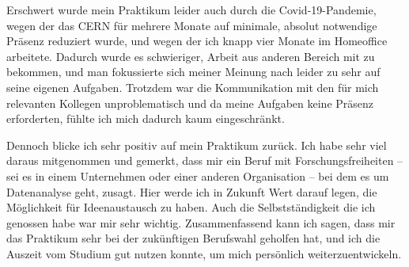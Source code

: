 \documentclass[11pt, a4paper, titlepage, headings=standardclasses]{scrartcl}
\begin{document}
Erschwert wurde mein Praktikum leider auch durch die Covid-19-Pandemie, wegen der das CERN für mehrere Monate auf minimale, absolut notwendige Präsenz reduziert wurde, und wegen der ich knapp vier Monate im Homeoffice arbeitete. Dadurch wurde es schwieriger, Arbeit aus anderen Bereich mit zu bekommen, und man fokussierte sich meiner Meinung nach leider zu sehr auf seine eigenen Aufgaben. Trotzdem war die Kommunikation mit den für mich relevanten Kollegen unproblematisch und da meine Aufgaben keine Präsenz erforderten, fühlte ich mich dadurch kaum eingeschränkt.

Dennoch blicke ich sehr positiv auf mein Praktikum zurück. Ich habe sehr viel daraus mitgenommen und gemerkt, dass mir ein Beruf mit Forschungsfreiheiten -- sei es in einem Unternehmen oder einer anderen Organisation -- bei dem es um Datenanalyse geht, zusagt. Hier werde ich in Zukunft Wert darauf legen, die Möglichkeit für Ideenaustausch zu haben. Auch die Selbstständigkeit die ich genossen habe war mir sehr wichtig. Zusammenfassend kann ich sagen, dass mir das Praktikum sehr bei der zukünftigen Berufswahl geholfen hat, und ich die Auszeit vom Studium gut nutzen konnte, um mich persönlich weiterzuentwickeln.

\clearpage
\printbibliography
\end{document}
